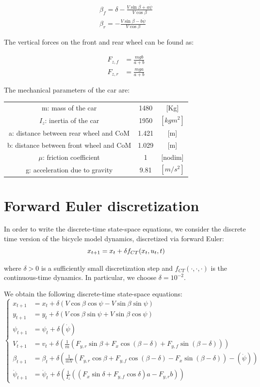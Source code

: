 \[
\begin{aligned}
    \beta_f = \delta - \frac{V\sin\beta + a\dot{\psi}}{V\cos\beta} \\
    \beta_r = -\frac{V\sin\beta - b\dot{\psi}}{V\cos\beta}
\end{aligned}
\]

The vertical forces on the front and rear wheel can be found as:

\[
\begin{aligned}
    F_{z,f} &= \frac{mgb}{a + b} \\
    F_{z,r} &= \frac{mga}{a + b}
\end{aligned}
\]

The mechanical parameters of the car are: 

\begin{center}
\begin{tabular}{ |c|c|c| } 
 \hline
 m: mass of the car & 1480 & [Kg] \\ 
 $I_z$: inertia of the car & 1950 & $[kg m^2]$ \\ 
 a: distance between rear wheel and CoM & 1.421 & [m]\\ 
 b: distance between front wheel and CoM & 1.029 & [m]\\ 
 $\mu$: friction coefficient & 1 & [nodim]\\ 
 g: acceleration due to gravity & 9.81 & $[m/s^2]$\\ 
 \hline
\end{tabular}
\end{center}


\section{Forward Euler discretization}
In order to write the discrete-time state-space equations, we consider the discrete time version of the bicycle model dynamics, discretized via forward Euler: 
\[
x_{t+1}  = x_t + \delta f_{CT} (x_t, u_t, t)\\
\]

where $\delta > 0$ is a sufficiently small discretization step and $f_{CT} (\cdot,\cdot,\cdot)$ is the continuous-time dynamics. In particular, we choose $\delta = 10^{-2}$. 


We obtain the following discrete-time state-space equations: 
\[
\begin{cases}
    x_{t+1} &= x_t + \delta(V\cos\beta\cos\psi - V\sin\beta\sin\psi) \\
    y_{t+1} &= y_t + \delta(V\cos\beta\sin\psi + V\sin\beta\cos\psi) \\
    \psi_{t+1} &= \psi_t + \delta(\dot{\psi}) \\
    V_{t+1} &= v_t + \delta\left(\frac{1}{m}\left(F_{y,r}\sin\beta + F_x\cos(\beta - \delta) + F_{y,f}\sin(\beta - \delta)\right)\right) \\
    \beta_{t+1} &= \beta_t + \delta\left(\frac{1}{mV}\left(F_{y,r}\cos\beta + F_{y,f}\cos(\beta - \delta) - F_x\sin(\beta - \delta)\right) - (\dot{\psi})\right) \\
    \dot{\psi}_{t+1} &= \dot{\psi}_t + \delta\left(\frac{1}{I_z}\left((F_x\sin\delta + F_{y,f}\cos\delta)a - F_{y,r}b\right)\right)
\end{cases} 
\]

